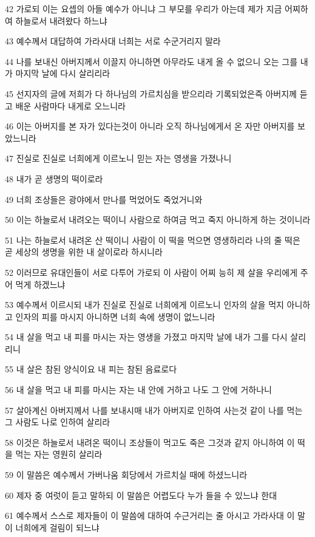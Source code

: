 \par 42 가로되 이는 요셉의 아들 예수가 아니냐 그 부모를 우리가 아는데 제가 지금 어찌하여 하늘로서 내려왔다 하느냐
\par 43 예수께서 대답하여 가라사대 너희는 서로 수군거리지 말라
\par 44 나를 보내신 아버지께서 이끌지 아니하면 아무라도 내게 올 수 없으니 오는 그를 내가 마지막 날에 다시 살리리라
\par 45 선지자의 글에 저희가 다 하나님의 가르치심을 받으리라 기록되었은즉 아버지께 듣고 배운 사람마다 내게로 오느니라
\par 46 이는 아버지를 본 자가 있다는것이 아니라 오직 하나님에게서 온 자만 아버지를 보았느니라
\par 47 진실로 진실로 너희에게 이르노니 믿는 자는 영생을 가졌나니
\par 48 내가 곧 생명의 떡이로라
\par 49 너희 조상들은 광야에서 만나를 먹었어도 죽었거니와
\par 50 이는 하늘로서 내려오는 떡이니 사람으로 하여금 먹고 죽지 아니하게 하는 것이니라
\par 51 나는 하늘로서 내려온 산 떡이니 사람이 이 떡을 먹으면 영생하리라 나의 줄 떡은 곧 세상의 생명을 위한 내 살이로라 하시니라
\par 52 이러므로 유대인들이 서로 다투어 가로되 이 사람이 어찌 능히 제 살을 우리에게 주어 먹게 하겠느냐
\par 53 예수께서 이르시되 내가 진실로 진실로 너희에게 이르노니 인자의 살을 먹지 아니하고 인자의 피를 마시지 아니하면 너희 속에 생명이 없느니라
\par 54 내 살을 먹고 내 피를 마시는 자는 영생을 가졌고 마지막 날에 내가 그를 다시 살리리니
\par 55 내 살은 참된 양식이요 내 피는 참된 음료로다
\par 56 내 살을 먹고 내 피를 마시는 자는 내 안에 거하고 나도 그 안에 거하나니
\par 57 살아계신 아버지께서 나를 보내시매 내가 아버지로 인하여 사는것 같이 나를 먹는 그 사람도 나로 인하여 살리라
\par 58 이것은 하늘로서 내려온 떡이니 조상들이 먹고도 죽은 그것과 같지 아니하여 이 떡을 먹는 자는 영원히 살리라
\par 59 이 말씀은 예수께서 가버나움 회당에서 가르치실 때에 하셨느니라
\par 60 제자 중 여럿이 듣고 말하되 이 말씀은 어렵도다 누가 들을 수 있느냐 한대
\par 61 예수께서 스스로 제자들이 이 말씀에 대하여 수근거리는 줄 아시고 가라사대 이 말이 너희에게 걸림이 되느냐
